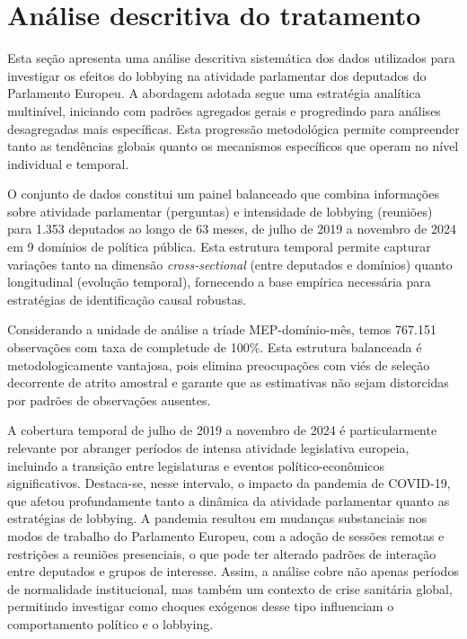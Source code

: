 \section{Análise descritiva do tratamento}
\label{sec:resultados_descritica}

Esta seção apresenta uma análise descritiva sistemática dos dados utilizados para investigar os efeitos do lobbying na atividade parlamentar dos deputados do Parlamento Europeu. A abordagem adotada segue uma estratégia analítica multinível, iniciando com padrões agregados gerais e progredindo para análises desagregadas mais específicas. Esta progressão metodológica permite compreender tanto as tendências globais quanto os mecanismos específicos que operam no nível individual e temporal.

O conjunto de dados constitui um painel balanceado que combina informações sobre atividade parlamentar (perguntas) e intensidade de lobbying (reuniões) para 1.353 deputados ao longo de 63 meses, de julho de 2019 a novembro de 2024 em 9 domínios de política pública. Esta estrutura temporal permite capturar variações tanto na dimensão \textit{cross-sectional} (entre deputados e domínios) quanto longitudinal (evolução temporal), fornecendo a base empírica necessária para estratégias de identificação causal robustas.

Considerando a unidade de análise a tríade MEP-domínio-mês, temos 767.151 observações com taxa de completude de 100\%. Esta estrutura balanceada é metodologicamente vantajosa, pois elimina preocupações com viés de seleção decorrente de atrito amostral e garante que as estimativas não sejam distorcidas por padrões de observações ausentes.

A cobertura temporal de julho de 2019 a novembro de 2024 é particularmente relevante por abranger períodos de intensa atividade legislativa europeia, incluindo a transição entre legislaturas e eventos político-econômicos significativos. Destaca-se, nesse intervalo, o impacto da pandemia de COVID-19, que afetou profundamente tanto a dinâmica da atividade parlamentar quanto as estratégias de lobbying. A pandemia resultou em mudanças substanciais nos modos de trabalho do Parlamento Europeu, com a adoção de sessões remotas e restrições a reuniões presenciais, o que pode ter alterado padrões de interação entre deputados e grupos de interesse. Assim, a análise cobre não apenas períodos de normalidade institucional, mas também um contexto de crise sanitária global, permitindo investigar como choques exógenos desse tipo influenciam o comportamento político e o lobbying.

